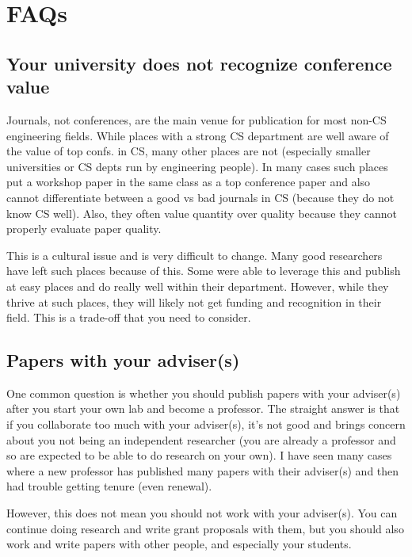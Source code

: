 \documentclass[oneside,11pt,dvipsnames]{book}
\begin{document}
\section{FAQs}



\subsection{Your university does not recognize conference value}

Journals, not conferences, are the main venue for publication for most non-CS engineering fields. While places with a strong CS department are well aware of the value of top confs. in CS, many other places are not (especially smaller universities or CS depts run by engineering people). In many cases such places put a workshop paper in the same class as a top conference paper and also cannot differentiate between a good vs bad journals in CS (because they do not know CS well). Also,  they often value quantity over quality because they cannot properly evaluate paper quality.

This is a cultural issue and is very difficult to change. Many good researchers have left such places because of this.  Some were able to leverage this and publish at easy places and do really well within their department.  However, while they thrive at such places, they will likely not get funding and recognition in their field.  This is a trade-off that you need to consider.


\subsection{Papers with your adviser(s)}
One common question is whether you should publish papers with your adviser(s) after you start your own lab and become a professor.  The straight answer is that if you collaborate too much with your adviser(s), it's not good and brings concern about you not being an independent researcher (you are already a professor and so are expected to be able to do research on your own). I have seen many cases where a new professor has published many papers with their adviser(s) and then had trouble getting tenure (even renewal).

However, this does not mean you should not work with your adviser(s). You can continue doing research and write grant proposals with them, but you should also work and write papers with other people, and especially your students.
\end{document}
